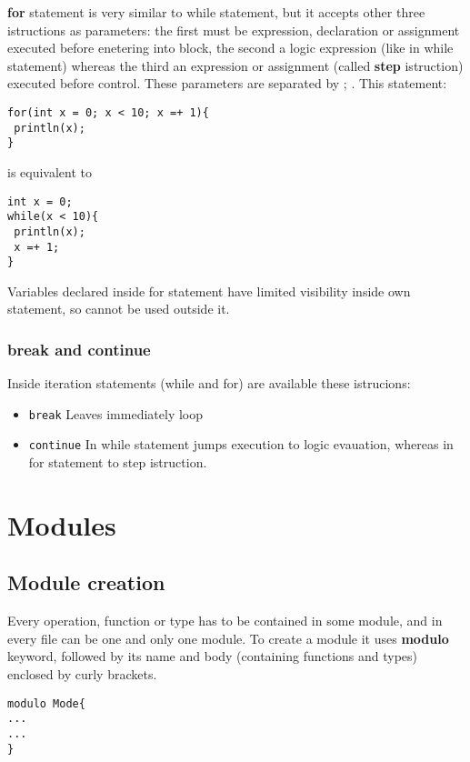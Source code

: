 \documentclass[10pt]{book}%
\newcommand{\code}[1]{\texttt{#1}}
\renewcommand{\emph}[1]{\textbf{#1}}
\newenvironment{codeenv}{
\begin{mdframed}[backgroundcolor=black!20,topline=false,leftline=false,rightline=false,bottomline=false]
}
{\end{mdframed}}
\begin{document}
\emph{for} statement is very similar to while statement, but it accepts other three istructions as parameters: the first must be expression, declaration or assignment executed before enetering into block, the second a logic expression (like in while statement) whereas the third an expression or assignment (called \emph{step} istruction) executed before control. These parameters are separated by ; . This statement:
\begin{codeenv}
\begin{verbatim}
for(int x = 0; x < 10; x =+ 1){
 println(x);
}
\end{verbatim}
\end{codeenv}
is equivalent to
\begin{codeenv}
\begin{verbatim}
int x = 0;
while(x < 10){
 println(x);
 x =+ 1;
}
\end{verbatim}
\end{codeenv}

Variables declared inside for statement have limited visibility inside own statement, so cannot be used outside it.

\subsection{break and continue}
Inside iteration statements (while and for) are available these istrucions:
\begin{itemize}
\item \code{break} Leaves immediately loop
\item \code{continue} In while statement jumps execution to logic evauation, whereas in for statement to step istruction.
\end{itemize}

\chapter{Modules}
\section{Module creation}
Every operation, function or type has to be contained in some module, and in every file can be one and only one module. To create a module it uses \emph{modulo} keyword, followed by its name and body (containing functions and types) enclosed by curly brackets.
\begin{codeenv}
\begin{verbatim}
modulo Mode{
...
...
}
\end{verbatim}
\end{codeenv}
\end{document}
